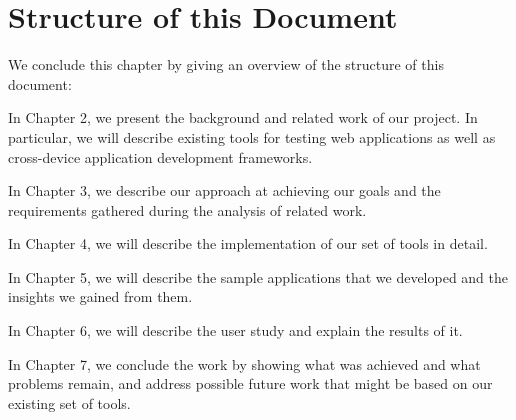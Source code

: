 \section{Structure of this Document}

We conclude this chapter by giving an overview of the structure of this document:

In Chapter 2, we present the background  and related work of our project. In particular, we will describe existing tools for testing web applications as well as cross-device application development frameworks.

In Chapter 3, we describe our approach at achieving our goals and the requirements gathered during the analysis of related work.

In Chapter 4, we will describe the implementation of our set of tools in detail.

In Chapter 5, we will describe the sample applications that we developed and the insights we gained from them.

In Chapter 6, we will describe the user study and explain the results of it.

In Chapter 7, we conclude the work by showing what was achieved and what problems remain, and address possible future work that might be based on our existing set of tools.